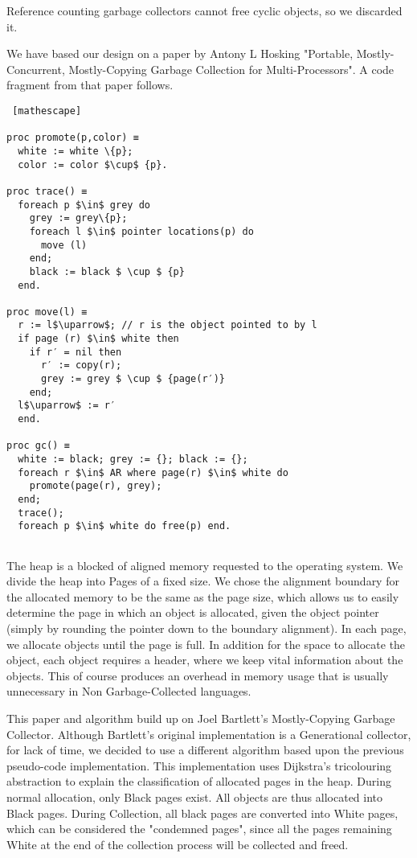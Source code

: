 \documentclass{article}
\begin{document}
Reference counting garbage collectors cannot free cyclic objects, so we discarded it. 

We have based our design on a paper by Antony L Hosking "Portable, Mostly-Concurrent, Mostly-Copying Garbage Collection for Multi-Processors". A code fragment from that paper follows. 
\begin{lstlisting} [mathescape]

proc promote(p,color) ≡ 
  white := white \{p}; 
  color := color $\cup$ {p}.

proc trace() ≡ 
  foreach p $\in$ grey do
    grey := grey\{p};
    foreach l $\in$ pointer locations(p) do
      move (l)
    end;
    black := black $ \cup $ {p}
  end.

proc move(l) ≡ 
  r := l$\uparrow$; // r is the object pointed to by l
  if page (r) $\in$ white then 
    if r′ = nil then
      r′ := copy(r);
      grey := grey $ \cup $ {page(r′)}
    end;
  l$\uparrow$ := r′
  end.

proc gc() ≡
  white := black; grey := {}; black := {}; 
  foreach r $\in$ AR where page(r) $\in$ white do
    promote(page(r), grey);
  end;
  trace();
  foreach p $\in$ white do free(p) end.
 
\end{lstlisting}

The heap is a blocked of aligned memory requested to the operating system. We divide the heap into Pages of a fixed
size. We chose the alignment boundary for the allocated memory to be the same as the page size, which allows us
to easily determine the page in which an object is allocated, given the object pointer (simply by rounding the pointer
down to the boundary alignment). In each page, we allocate objects until the page is full. In addition for the space 
to allocate the object, each object requires a header, where we keep vital information about the objects. This of course produces an overhead in 
memory usage that is usually unnecessary in Non Garbage-Collected languages. 


This paper and algorithm build up on Joel Bartlett's Mostly-Copying Garbage Collector. Although Bartlett's 
original implementation is a Generational collector, for lack of time, we decided to use a different algorithm based
upon the previous pseudo-code implementation. This implementation uses Dijkstra's tricolouring abstraction to explain
the classification of allocated pages in the heap. During normal allocation, only Black pages exist. All objects are 
thus allocated into Black pages. During Collection, all black pages are converted into White pages, which can be 
considered the "condemned pages", since all the pages remaining White at the end of the collection process will be 
collected and freed. 
\end{document}
